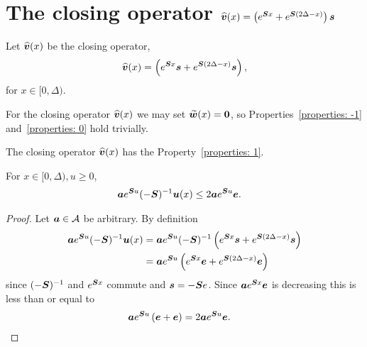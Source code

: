 
\section{The closing operator \(\widehat{\boldsymbol v}(x) =  \left(e^{\boldsymbol{S} x}  + e^{\boldsymbol{S} (2\Delta-x)}  \right)\boldsymbol s\)}

Let \(\widehat{\boldsymbol v}(x)\) be the closing operator, 
\[  \widehat{\boldsymbol v}(x) =   \left(e^{\boldsymbol{S} x}\boldsymbol s  + e^{\boldsymbol{S} (2\Delta-x)}\boldsymbol s\right),\]
for \(x\in[0,\Delta)\).

For the closing operator \(\widehat{\boldsymbol v}(x)\) we may set \(\widetilde{\boldsymbol w}(x) = \boldsymbol 0\), so Properties~\ref{properties: -1} and~\ref{properties: 0} hold trivially.

\begin{lem}\label{lem: akxnj}
	The closing operator \(\widehat{\boldsymbol v}(x)\) has the Property~\ref{properties: 1}.

	For \(x\in[0,\Delta),u\geq 0\),  
        \begin{align*}
        		\boldsymbol a   e^{\boldsymbol Su}(-\boldsymbol S)^{-1} {\boldsymbol u}(x) &\leq 2 \boldsymbol a e^{\boldsymbol Su} \boldsymbol e.
	\end{align*}
\end{lem}
\begin{proof}
Let \(\boldsymbol a   \in \mathcal A\) be arbitrary. By definition 
	\begin{align*}
        		\boldsymbol a  e^{\boldsymbol Su}(-\boldsymbol S)^{-1} {\boldsymbol u}(x) & = \boldsymbol a  e^{\boldsymbol Su}(-\boldsymbol S)^{-1}  \left(e^{\boldsymbol{S}x}\boldsymbol s + e^{\boldsymbol{S}(2\Delta-x)}\boldsymbol s\right)
				\\& = \boldsymbol a  e^{\boldsymbol Su}  \left(e^{\boldsymbol{S}x}\boldsymbol e + e^{\boldsymbol{S}(2\Delta-x)}\boldsymbol e\right)
	\end{align*}
	since \((-\boldsymbol S)^{-1}\) and \(e^{\boldsymbol Sx}\) commute and \(\boldsymbol s = -\boldsymbol S e\). 
	Since \(\boldsymbol a e^{\boldsymbol Sx}\boldsymbol e\) is decreasing this is less than or equal to 
	\begin{align}
        		& \boldsymbol a   e^{\boldsymbol Su} \left(\boldsymbol e + \boldsymbol e\right) = 2 \boldsymbol a   e^{\boldsymbol Su} \boldsymbol e. \label{eqn:mzm}
	\end{align}
\end{proof}

